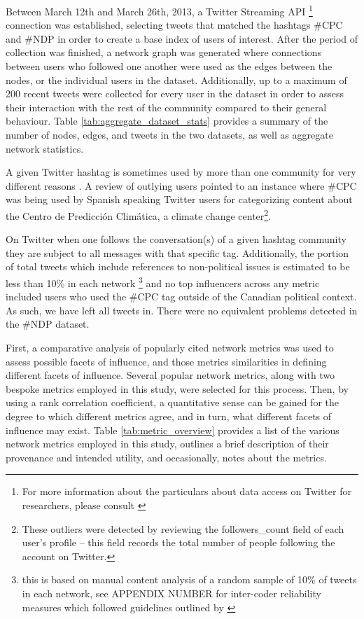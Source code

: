\documentclass[a4paper,12pt]{article}
\begin{document}
Between March 12th and March 26th, 2013, a Twitter Streaming API \footnote{For more information about the particulars about data access on Twitter for researchers, please consult \cite{GaffneyPushmann2013}} connection was established, selecting tweets that matched the hashtags \#CPC and \#NDP in order to create a base index of users of interest. After the period of collection was finished, a network graph was generated where connections between users who followed one another were used as the edges between the nodes, or the individual users in the dataset. Additionally, up to a maximum of 200 recent tweets were collected for every user in the dataset in order to assess their interaction with the rest of the community compared to their general behaviour. Table \ref{tab:aggregate_dataset_stats} provides a summary of the number of nodes, edges, and tweets in the two datasets, as well as aggregate network statistics.

A given Twitter hashtag is sometimes used by more than one community for very different reasons \cite{ConoverGoncalvesRakiewiczFlamminiMenczer2011}. A review of outlying users pointed to an instance where \#CPC was being used by Spanish speaking Twitter users for categorizing content about the Centro de Predicci\'on Clim\'atica, a climate change center\footnote{These outliers were detected by reviewing the followers\_count field of each user's profile -- this field records the total number of people following the account on Twitter.}.

On Twitter when one follows the conversation(s) of a given hashtag community they are subject to all messages with that specific tag. Additionally, the portion of total tweets which include references to non-political issues is estimated to be less than 10\% in each network \footnote{this is based on manual content analysis of a random sample of 10\% of tweets in each network, see APPENDIX NUMBER for inter-coder reliability measures which followed guidelines outlined by \cite{lombardsnyderduchbracken}} and no top influencers across any metric included users who used the \#CPC tag outside of the Canadian political context. As such, we have left all tweets in. There were no equivalent problems detected in the \#NDP dataset.

First, a comparative analysis of popularly cited network metrics was used to assess possible facets of influence, and those metrics similarities in defining different facets of influence. Several popular network metrics, along with two bespoke metrics employed in this study, were selected for this process. Then, by using a rank correlation coefficient, a quantitative sense can be gained for the degree to which different metrics agree, and in turn, what different facets of influence may exist. Table \ref{tab:metric_overview} provides a list of the various network metrics employed in this study, outlines a brief description of their provenance and intended utility, and occasionally, notes about the metrics. 
\end{document}
